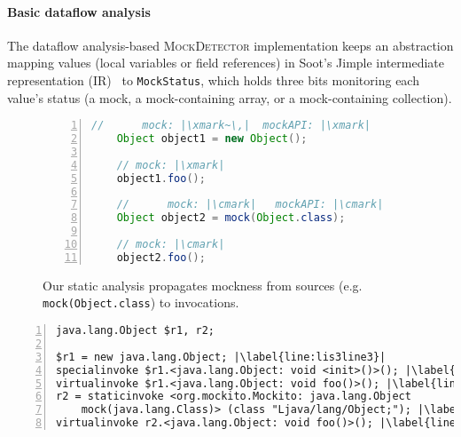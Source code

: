 \paragraph{Basic dataflow analysis} The dataflow analysis-based \textsc{MockDetector} implementation keeps an abstraction mapping values (local variables or field references) in Soot's Jimple intermediate representation (IR)~\cite{Vallee-Rai:1999:SJB:781995.782008} to \texttt{MockStatus}, which holds three bits monitoring each value's status (a mock, a mock-containing array, or a mock-containing collection). %

\begin{figure}[H]
	\begin{lstlisting}[basicstyle=\ttfamily,
	numbers=left,numbersep=0pt,basicstyle=\scriptsize\ttfamily,language = Java, framesep=4.5mm, framexleftmargin=1.0mm, captionpos=b, escapechar=|, morekeywords={@Test}]
	//      mock: |\xmark~\,|  mockAPI: |\xmark|
	Object object1 = new Object();
	
	// mock: |\xmark|
	object1.foo();
	
	//      mock: |\cmark|   mockAPI: |\cmark|
	Object object2 = mock(Object.class);
	
	// mock: |\cmark|
	object2.foo();
	\end{lstlisting}
	\caption{Our static analysis propagates mockness from sources (e.g. \texttt{mock(Object.class}) to invocations.}
	\label{fig:mockMethodIllustration}
	
\end{figure}

\begin{lstlisting}[basicstyle=\ttfamily, caption={Jimple Intermediate Representation for the code in Figure~\ref{fig:mockMethodIllustration}.},
numbers=left,numbersep=2pt,basicstyle=\scriptsize\ttfamily, captionpos=b, label=lis:mockMethodIllustrationIR, escapechar=|, morekeywords={@Test, specialinvoke, virtualinvoke, staticinvoke}]
java.lang.Object $r1, r2;

$r1 = new java.lang.Object; |\label{line:lis3line3}|
specialinvoke $r1.<java.lang.Object: void <init>()>(); |\label{line:lis3line4}|
virtualinvoke $r1.<java.lang.Object: void foo()>(); |\label{line:lis3line5}|
r2 = staticinvoke <org.mockito.Mockito: java.lang.Object
	mock(java.lang.Class)> (class "Ljava/lang/Object;"); |\label{line:lis3line6}|
virtualinvoke r2.<java.lang.Object: void foo()>(); |\label{line:lis3line9}|
\end{lstlisting}


